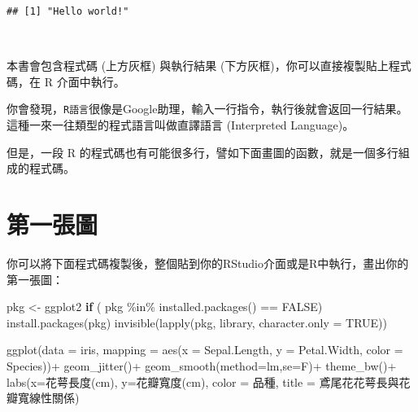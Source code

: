 \documentclass[
]{book}
\newenvironment{Shaded}{\begin{snugshade}}{\end{snugshade}}
\newcommand{\AttributeTok}[1]{\textcolor[rgb]{0.77,0.63,0.00}{#1}}
\newcommand{\ConstantTok}[1]{\textcolor[rgb]{0.00,0.00,0.00}{#1}}
\newcommand{\ControlFlowTok}[1]{\textcolor[rgb]{0.13,0.29,0.53}{\textbf{#1}}}
\newcommand{\FunctionTok}[1]{\textcolor[rgb]{0.00,0.00,0.00}{#1}}
\newcommand{\NormalTok}[1]{#1}
\newcommand{\OtherTok}[1]{\textcolor[rgb]{0.56,0.35,0.01}{#1}}
\newcommand{\SpecialCharTok}[1]{\textcolor[rgb]{0.00,0.00,0.00}{#1}}
\newcommand{\StringTok}[1]{\textcolor[rgb]{0.31,0.60,0.02}{#1}}
\begin{document}
\begin{verbatim}
## [1] "Hello world!"
\end{verbatim}

　

本書會包含程式碼 (上方灰框) 與執行結果 (下方灰框)，你可以直接複製貼上程式碼，在 R 介面中執行。
　

你會發現，\texttt{R語言}很像是Google助理，輸入一行指令，執行後就會返回一行結果。這種一來一往類型的程式語言叫做直譯語言 (Interpreted Language)。

但是，一段 R 的程式碼也有可能很多行，譬如下面畫圖的函數，就是一個多行組成的程式碼。
　
　

\hypertarget{ux7b2cux4e00ux5f35ux5716}{%
\section{第一張圖}\label{ux7b2cux4e00ux5f35ux5716}}

你可以將下面程式碼複製後，整個貼到你的RStudio介面或是R中執行，畫出你的第一張圖：

\begin{Shaded}
\begin{Highlighting}[]
\NormalTok{pkg }\OtherTok{\textless{}{-}} \StringTok{\textquotesingle{}ggplot2\textquotesingle{}}
\ControlFlowTok{if}\NormalTok{ ( pkg }\SpecialCharTok{\%in\%} \FunctionTok{installed.packages}\NormalTok{() }\SpecialCharTok{==} \ConstantTok{FALSE}\NormalTok{) }\FunctionTok{install.packages}\NormalTok{(pkg) }
\FunctionTok{invisible}\NormalTok{(}\FunctionTok{lapply}\NormalTok{(pkg, library, }\AttributeTok{character.only =} \ConstantTok{TRUE}\NormalTok{))}

\FunctionTok{ggplot}\NormalTok{(}\AttributeTok{data =}\NormalTok{ iris, }\AttributeTok{mapping =} \FunctionTok{aes}\NormalTok{(}\AttributeTok{x =}\NormalTok{ Sepal.Length, }\AttributeTok{y =}\NormalTok{ Petal.Width, }\AttributeTok{color =}\NormalTok{ Species))}\SpecialCharTok{+}
  \FunctionTok{geom\_jitter}\NormalTok{()}\SpecialCharTok{+}
  \FunctionTok{geom\_smooth}\NormalTok{(}\AttributeTok{method=}\StringTok{\textquotesingle{}lm\textquotesingle{}}\NormalTok{,}\AttributeTok{se=}\NormalTok{F)}\SpecialCharTok{+}
  \FunctionTok{theme\_bw}\NormalTok{()}\SpecialCharTok{+}
  \FunctionTok{labs}\NormalTok{(}\AttributeTok{x=}\StringTok{\textquotesingle{}花萼長度(cm)\textquotesingle{}}\NormalTok{,}
       \AttributeTok{y=}\StringTok{\textquotesingle{}花瓣寬度(cm)\textquotesingle{}}\NormalTok{,}
       \AttributeTok{color =} \StringTok{\textquotesingle{}品種\textquotesingle{}}\NormalTok{,}
       \AttributeTok{title =} \StringTok{\textquotesingle{}鳶尾花花萼長與花瓣寬線性關係\textquotesingle{}}\NormalTok{)}
\end{Highlighting}
\end{Shaded}
\end{document}
